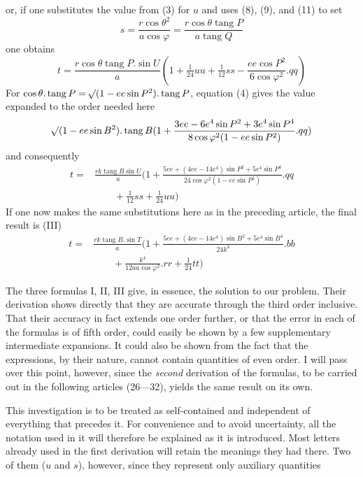 %
or, if one substitutes the value from (3) for \(u\) and uses (8), (9), and (11) to set
\[
s=\frac{r\cos\theta^2}{a\cos\varphi}=\frac{r\cos\theta\operatorname{tang}P}{a\operatorname{tang}Q}
\]
one obtains
\[
t=\frac{r\cos\theta\operatorname{tang}P\mathord{.}\sin U}{a}(1+\tfrac1{24}uu+\tfrac1{12}ss-\frac{ee\cos P^2}{6\cos\varphi^2}\mathord{.}qq)
\]
For \(\cos\theta\mathord{.}\operatorname{tang}P=\mathord{{}^{}\!\surd}(1-ee\sin P^2)\mathord{.}\operatorname{tang}P\), equation (4) gives the value expanded to the order needed here
\[
\mathord{{}^{}\!\surd}(1-ee\sin B^2)\mathord{.}\operatorname{tang}B(1+\frac{3ee-6e^4\sin P^2+3e^4\sin P^4}{8\cos\varphi^2(1-ee\sin P^2)}\mathord{.}qq)
\]
and consequently
\[
\begin{aligned}
t={}&\frac{rk\operatorname{tang}B\sin U}{a}(1+\frac{5ee+(4ee-14e^4)\sin P^2+5e^4\sin P^4}{24\cos\varphi^2(1-ee\sin P^2)}\mathord{.}qq\\
&\qquad+\tfrac1{12}ss+\tfrac1{24}uu)
\end{aligned}
\]
If one now makes the same substitutions here as in the preceding article, the final result is (III)
\[
\begin{aligned}
t={}&\frac{rk\operatorname{tang}B\mathord{.}\sin T}{a}(1+\frac{5ee+(4ee-14e^4)\sin B^2+5e^4\sin B^4}{24k^4}\mathord{.}bb\\
&\qquad+\frac{k^4}{12aa\cos\varphi^2}\mathord{.}rr+\tfrac1{24}tt)
\end{aligned}
\]

\indent The three formulas I, II, III give, in essence, the solution to our problem. Their derivation shows directly that they are accurate through the third order inclusive. That their accuracy in fact extends one order further, or that the error in each of the formulas is of fifth order, could easily be shown by a few supplementary intermediate expansions. It could also be shown from the fact that the expressions, by their nature, cannot contain quantities of even order. I will pass over this point, however, since the \textit{second} derivation of the formulas, to be carried out in the following articles (26---32), yields the same result on its own.

This investigation is to be treated as self-contained and independent of everything that precedes it. For convenience and to avoid uncertainty, all the notation used in it will therefore be explained as it is introduced. Most letters already used in the first derivation will retain the meanings they had there. Two of them (\(u\) and \(s\)), however, since they represent only auxiliary quantities%
